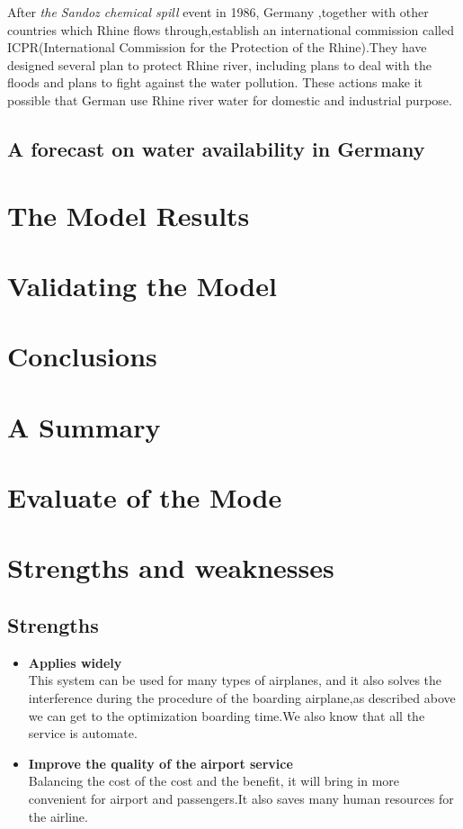 \documentclass{mcmthesis}
\begin{document}
	After \textit{the Sandoz chemical spill} event in 1986, Germany ,together with other countries which Rhine flows through,establish an international commission called ICPR(International Commission for the Protection of the Rhine).They have designed several plan to protect Rhine river, including plans to deal with the floods and plans to fight against the water pollution. These actions make it possible that German use Rhine river water for domestic and industrial purpose.
	\subsection{A forecast on water availability in Germany }
\section{The Model Results}
\lipsum[6]

\section{Validating the Model}
\lipsum[9]

\section{Conclusions}
\lipsum[6]

\section{A Summary}
\lipsum[6]

\section{Evaluate of the Mode}

\section{Strengths and weaknesses}
\lipsum[12]

\subsection{Strengths}
\begin{itemize}
\item \textbf{Applies widely}\\
This  system can be used for many types of airplanes, and it also
solves the interference during  the procedure of the boarding
airplane,as described above we can get to the  optimization
boarding time.We also know that all the service is automate.
\item \textbf{Improve the quality of the airport service}\\
Balancing the cost of the cost and the benefit, it will bring in
more convenient  for airport and passengers.It also saves many
human resources for the airline. 
\end{itemize}
\end{document}
